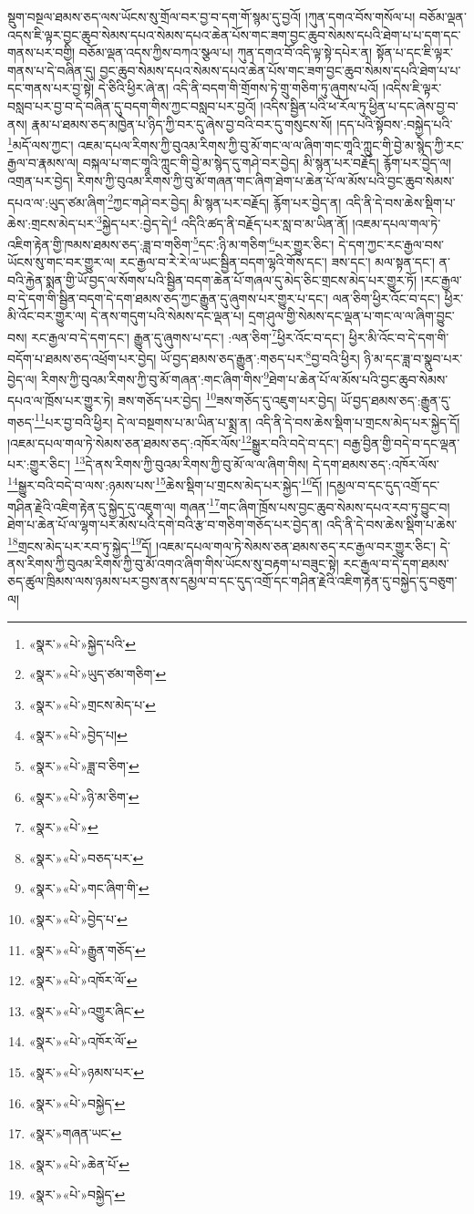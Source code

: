 སྡུག་བསྔལ་ཐམས་ཅད་ལས་ཡོངས་སུ་གྲོལ་བར་བྱ་བ་དག་གོ་སྙམ་དུ་བྱའོ། །ཀུན་དགའ་བོས་གསོལ་པ། བཅོམ་ལྡན་འདས་ཇི་ལྟར་བྱང་ཆུབ་སེམས་དཔའ་སེམས་དཔའ་ཆེན་པོས་གང་ཟག་བྱང་ཆུབ་སེམས་དཔའི་ཐེག་པ་པ་དག་དང་གནས་པར་བགྱི། བཅོམ་ལྡན་འདས་ཀྱིས་བཀའ་སྩལ་པ། ཀུན་དགའ་བོ་འདི་ལྟ་སྟེ་དཔེར་ན། སྟོན་པ་དང་ཇི་ལྟར་གནས་པ་དེ་བཞིན་དུ། བྱང་ཆུབ་སེམས་དཔའ་སེམས་དཔའ་ཆེན་པོས་གང་ཟག་བྱང་ཆུབ་སེམས་དཔའི་ཐེག་པ་པ་དང་གནས་པར་བྱ་སྟེ། དེ་ཅིའི་ཕྱིར་ཞེ་ན། འདི་ནི་བདག་གི་གྲོགས་ཏེ་གྲུ་གཅིག་ཏུ་ཞུགས་པའོ། །འདིས་ཇི་ལྟར་བསླབ་པར་བྱ་བ་དེ་བཞིན་དུ་བདག་གིས་ཀྱང་བསླབ་པར་བྱའོ། །འདིས་སྦྱིན་པའི་ཕ་རོལ་ཏུ་ཕྱིན་པ་དང་ཞེས་བྱ་བ་ནས། རྣམ་པ་ཐམས་ཅད་མཁྱེན་པ་ཉིད་ཀྱི་བར་དུ་ཞེས་བྱ་བའི་བར་དུ་གསུངས་སོ། །དད་པའི་སྟོབས་:བསྐྱེད་པའི་\footnote{«སྣར་»«པེ་»སྐྱེད་པའི་}མདོ་ལས་ཀྱང་། འཇམ་དཔལ་རིགས་ཀྱི་བུའམ་རིགས་ཀྱི་བུ་མོ་གང་ལ་ལ་ཞིག་གང་གཱའི་ཀླུང་གི་བྱེ་མ་སྙེད་ཀྱི་རང་རྒྱལ་བ་རྣམས་ལ། བསྐལ་པ་གང་གཱའི་ཀླུང་གི་བྱེ་མ་སྙེད་དུ་གཤེ་བར་བྱེད། མི་སྙན་པར་བརྗོད། རྙོག་པར་བྱེད་ལ། འགྲན་པར་བྱེད། རིགས་ཀྱི་བུའམ་རིགས་ཀྱི་བུ་མོ་གཞན་གང་ཞིག་ཐེག་པ་ཆེན་པོ་ལ་མོས་པའི་བྱང་ཆུབ་སེམས་དཔའ་ལ་:ཡུད་ཙམ་ཞིག་\footnote{«སྣར་»«པེ་»ཡུད་ཙམ་གཅིག་}ཀྱང་གཤེ་བར་བྱེད། མི་སྙན་པར་བརྗོད། རྙོག་པར་བྱེད་ན། འདི་ནི་དེ་བས་ཆེས་སྡིག་པ་ཆེས་:གྲངས་མེད་པར་\footnote{«སྣར་»«པེ་»གྲངས་མེད་པ་}སྐྱེད་པར་:བྱེད་དེ།\footnote{«སྣར་»«པེ་»བྱེད་པ།} འདིའི་ཚད་ནི་བརྗོད་པར་སླ་བ་མ་ཡིན་ནོ། །འཇམ་དཔལ་གལ་ཏེ་འཇིག་རྟེན་གྱི་ཁམས་ཐམས་ཅད་:ཟླ་བ་གཅིག་\footnote{«སྣར་»«པེ་»ཟླ་བ་ཅིག་}དང་:ཉི་མ་གཅིག་\footnote{«སྣར་»«པེ་»ཉི་མ་ཅིག་}པར་གྱུར་ཅིང་། དེ་དག་ཀྱང་རང་རྒྱལ་བས་ཡོངས་སུ་གང་བར་གྱུར་ལ། རང་རྒྱལ་བ་རེ་རེ་ལ་ཡང་སྦྱིན་བདག་ལྷའི་གོས་དང་། ཟས་དང་། མལ་སྟན་དང་། ན་བའི་རྐྱེན་སྨན་གྱི་ཡོ་བྱད་ལ་སོགས་པའི་སྦྱིན་བདག་ཆེན་པོ་གཞལ་དུ་མེད་ཅིང་གྲངས་མེད་པར་གྱུར་ཏོ། །རང་རྒྱལ་བ་དེ་དག་གི་སྦྱིན་བདག་དེ་དག་ཐམས་ཅད་ཀྱང་རྒྱུན་དུ་ཞུགས་པར་གྱུར་པ་དང་། ལན་ཅིག་ཕྱིར་འོང་བ་དང་། ཕྱིར་མི་འོང་བར་གྱུར་ལ། དེ་ནས་གདུག་པའི་སེམས་དང་ལྡན་པ། དྲག་ཤུལ་གྱི་སེམས་དང་ལྡན་པ་གང་ལ་ལ་ཞིག་བྱུང་བས། རང་རྒྱལ་བ་དེ་དག་དང་། རྒྱུན་དུ་ཞུགས་པ་དང་། :ལན་ཅིག་\footnote{«སྣར་»«པེ་»}ཕྱིར་འོང་བ་དང་། ཕྱིར་མི་འོང་བ་དེ་དག་གི་བདོག་པ་ཐམས་ཅད་འཕྲོག་པར་བྱེད། ཡོ་བྱད་ཐམས་ཅད་རྒྱུན་:གཅད་པར་\footnote{«སྣར་»«པེ་»བཅད་པར་}བྱ་བའི་ཕྱིར། ཉི་མ་དང་ཟླ་བ་སྣུབ་པར་བྱེད་ལ། རིགས་ཀྱི་བུའམ་རིགས་ཀྱི་བུ་མོ་གཞན་:གང་ཞིག་གིས་\footnote{«སྣར་»«པེ་»གང་ཞིག་གི་}ཐེག་པ་ཆེན་པོ་ལ་མོས་པའི་བྱང་ཆུབ་སེམས་དཔའ་ལ་ཁྲོས་པར་གྱུར་ཏེ། ཟས་གཅོད་པར་བྱེད། \footnote{«སྣར་»«པེ་»བྱེད་པ་}ཟས་གཅོད་དུ་འཇུག་པར་བྱེད། ཡོ་བྱད་ཐམས་ཅད་:རྒྱུན་དུ་གཅད་\footnote{«སྣར་»«པེ་»རྒྱུན་གཅོད་}པར་བྱ་བའི་ཕྱིར། དེ་ལ་བསྔགས་པ་མ་ཡིན་པ་སྨྲ་ན། འདི་ནི་དེ་བས་ཆེས་སྡིག་པ་གྲངས་མེད་པར་སྐྱེད་དོ། །འཇམ་དཔལ་གལ་ཏེ་སེམས་ཅན་ཐམས་ཅད་:འཁོར་ལོས་\footnote{«སྣར་»«པེ་»འཁོར་ལོ་}སྒྱུར་བའི་བདེ་བ་དང་། བརྒྱ་བྱིན་གྱི་བདེ་བ་དང་ལྡན་པར་:གྱུར་ཅིང་། \footnote{«སྣར་»«པེ་»འགྱུར་ཞིང་}དེ་ནས་རིགས་ཀྱི་བུའམ་རིགས་ཀྱི་བུ་མོ་ལ་ལ་ཞིག་གིས། དེ་དག་ཐམས་ཅད་:འཁོར་ལོས་\footnote{«སྣར་»«པེ་»འཁོར་ལོ་}སྒྱུར་བའི་བདེ་བ་ལས་:ཉམས་པས་\footnote{«སྣར་»«པེ་»ཉམས་པར་}ཆེས་སྡིག་པ་གྲངས་མེད་པར་སྐྱེད་\footnote{«སྣར་»«པེ་»བསྐྱེད་}དོ། །དམྱལ་བ་དང་དུད་འགྲོ་དང་གཤིན་རྗེའི་འཇིག་རྟེན་དུ་སྐྱེད་དུ་འཇུག་ལ། གཞན་\footnote{«སྣར་»གཞན་ཡང་}གང་ཞིག་ཁྲོས་པས་བྱང་ཆུབ་སེམས་དཔའ་རབ་ཏུ་བྱུང་བ། ཐེག་པ་ཆེན་པོ་ལ་ལྷག་པར་མོས་པའི་དགེ་བའི་རྩ་བ་གཅིག་གཅོད་པར་བྱེད་ན། འདི་ནི་དེ་བས་ཆེས་སྡིག་པ་ཆེས་\footnote{«སྣར་»«པེ་»ཆེན་པོ་}གྲངས་མེད་པར་རབ་ཏུ་སྐྱེད་\footnote{«སྣར་»«པེ་»བསྐྱེད་}དོ། །འཇམ་དཔལ་གལ་ཏེ་སེམས་ཅན་ཐམས་ཅད་རང་རྒྱལ་བར་གྱུར་ཅིང་། དེ་ནས་རིགས་ཀྱི་བུའམ་རིགས་ཀྱི་བུ་མོ་འགའ་ཞིག་གིས་ཡོངས་སུ་བརྟག་པ་བཟུང་སྟེ། རང་རྒྱལ་བ་དེ་དག་ཐམས་ཅད་ཚུལ་ཁྲིམས་ལས་ཉམས་པར་བྱས་ནས་དམྱལ་བ་དང་དུད་འགྲོ་དང་གཤིན་རྗེའི་འཇིག་རྟེན་དུ་བསྐྱེད་དུ་བཅུག་ལ། 